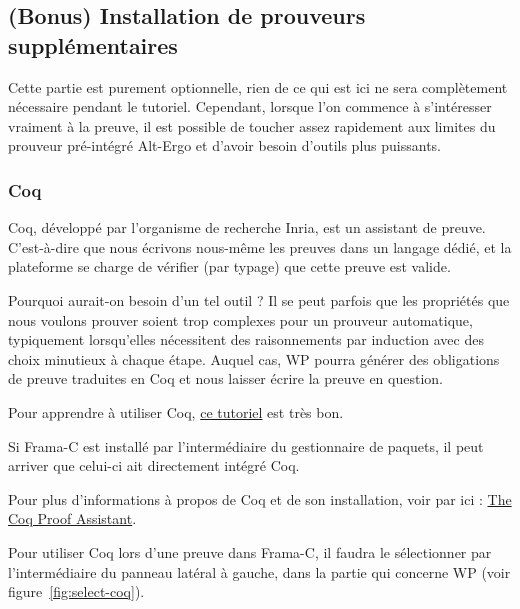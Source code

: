 \documentclass[12pt,francais,]{scrbook}
\newenvironment{zdsblock}[1]{%
  \tcolorbox[beamer,%
    noparskip,breakable,
    colback=LightBlue,colframe=DarkBlue,%
    colbacklower=DarkBlue,%
    title=#1]
}{\endtcolorbox}
\begin{document}
\subsection{(Bonus) Installation de prouveurs
supplémentaires}\label{bonus-installation-de-prouveurs-suppluxe9mentaires}

Cette partie est purement optionnelle, rien de ce qui est ici ne sera
complètement nécessaire pendant le tutoriel. Cependant, lorsque l'on
commence à s'intéresser vraiment à la preuve, il est possible de toucher
assez rapidement aux limites du prouveur pré-intégré Alt-Ergo et d'avoir
besoin d'outils plus puissants.

\subsubsection{Coq}\label{coq}

Coq, développé par l'organisme de recherche Inria, est un assistant de
preuve. C'est-à-dire que nous écrivons nous-même les preuves dans un
langage dédié, et la plateforme se charge de vérifier (par typage) que
cette preuve est valide.

Pourquoi aurait-on besoin d'un tel outil ? Il se peut parfois que les
propriétés que nous voulons prouver soient trop complexes pour un
prouveur automatique, typiquement lorsqu'elles nécessitent des
raisonnements par induction avec des choix minutieux à chaque étape.
Auquel cas, WP pourra générer des obligations de preuve traduites en Coq
et nous laisser écrire la preuve en question.

Pour apprendre à utiliser Coq,
\href{http://www.cis.upenn.edu/~bcpierce/sf/current/index.html}{ce
tutoriel} est très bon.

\begin{zdsblock}{Information}
Si Frama-C est installé par
l'intermédiaire du gestionnaire de paquets, il peut
arriver que celui-ci ait directement intégré Coq.
\end{zdsblock}

Pour plus d'informations à propos de Coq et de son installation, voir
par ici : \href{https://coq.inria.fr/}{The Coq Proof Assistant}.

Pour utiliser Coq lors d'une preuve dans Frama-C, il faudra le
sélectionner par l'intermédiaire du panneau latéral à gauche, dans la
partie qui concerne WP (voir figure~\ref{fig:select-coq}).
\end{document}
